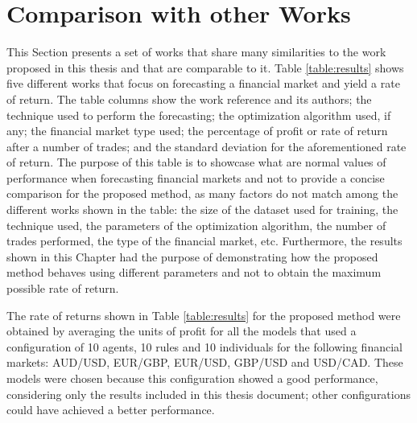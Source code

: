 \section{Comparison with other Works}
\label{section:comparison-with-other-works}

This Section presents a set of works that share many similarities to the work
proposed in this thesis and that are comparable to it. Table \ref{table:results}
shows five different works that focus on forecasting a financial market and
yield a rate of return. The table columns show the work reference and its
authors; the technique used to perform the forecasting; the optimization
algorithm used, if any; the financial market type used; the percentage of profit
or rate of return after a number of trades; and the standard deviation for the
aforementioned rate of return. The purpose of this table is to showcase what are
normal values of performance when forecasting financial markets and not to
provide a concise comparison for the proposed method, as many factors do not
match among the different works shown in the table: the size of the dataset used
for training, the technique used, the parameters of the optimization algorithm,
the number of trades performed, the type of the financial market,
etc. Furthermore, the results shown in this Chapter had the purpose of
demonstrating how the proposed method behaves using different parameters and not
to obtain the maximum possible rate of return.

The rate of returns shown in Table \ref{table:results} for the proposed method
were obtained by averaging the units of profit for all the models that used a
configuration of 10 agents, 10 rules and 10 individuals for the following
financial markets: AUD/USD, EUR/GBP, EUR/USD, GBP/USD and USD/CAD. These models
were chosen because this configuration showed a good performance, considering
only the results included in this thesis document; other configurations could
have achieved a better performance.

